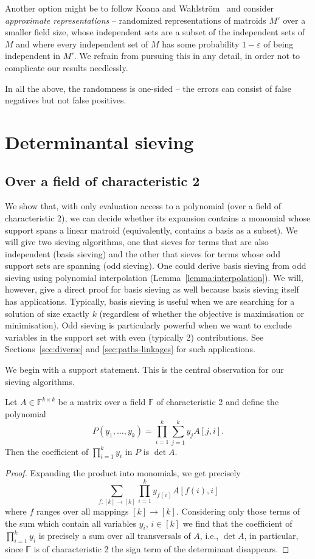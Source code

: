 \documentclass{theoretics}
\newcommand{\F}{\ensuremath{\mathbb F}\xspace}
\begin{document}
Another option might be to follow Koana and Wahlström~\cite{KoanaW25stacs}
and consider \emph{approximate representations} -- randomized
representations of matroids $M'$ over a smaller field size, whose
independent sets are a subset of the independent sets of $M$
and where every independent set of $M$ has some probability $1-\varepsilon$
of being independent in $M'$. We refrain from pursuing this in any detail,
in order not to complicate our results needlessly.

In all the above, the randomness is one-sided -- the errors can
consist of false negatives but not false positives. 


\section{Determinantal sieving}
\label{sec:sieving} 

\subsection{Over a field of characteristic 2}

We show that, with only evaluation access to a polynomial (over a
field of characteristic 2), we  can decide whether its expansion contains a monomial whose support spans a linear matroid
(equivalently, contains a basis as a subset).
We will give two sieving algorithms, one that sieves for terms that are also independent (basis sieving) and the other that sieves for terms whose odd support sets are spanning (odd sieving).
One could derive basis sieving from odd sieving using polynomial interpolation (Lemma~\ref{lemma:interpolation}).
We will, however, give a direct proof for basis sieving as well because basis sieving itself has applications.
Typically, basis sieving is useful when we are searching for a solution of size exactly $k$ (regardless of whether the objective is maximisation or minimisation).
Odd sieving is particularly powerful when we want to exclude variables in the support set with even (typically 2) contributions.
See Sections~\ref{sec:diverse} and \ref{sec:paths-linkages} for such applications.

We begin with a support statement. This is the central observation
for our sieving algorithms.

\begin{lemma} \label{lemma:sieve-determinant}
  Let $A \in \F^{k \times k}$ be a matrix over a field $\F$ of
  characteristic 2 and define the polynomial
  \[
    P(y_1,\ldots,y_k) = \prod_{i=1}^k \sum_{j=1}^k y_j A[j,i].
  \]
  Then the coefficient of $\prod_{i=1}^k y_i$ in $P$
  is $\det A$. 
\end{lemma}
\begin{proof}
  Expanding the product into monomials, we get precisely
  \[
    \sum_{f \colon [k] \to [k]} \prod_{i=1}^k y_{f(i)} A[f(i),i]
  \]
  where $f$ ranges over all mappings $[k] \to [k]$.
  Considering only those terms of the sum which contain
  all variables $y_i$, $i \in [k]$ we find that the coefficient of
  $\prod_{i=1}^k y_i$ is precisely a sum over all transversals of $A$,
  i.e., $\det A$, in particular, since $\F$ is of characteristic 2
  the sign term of the determinant disappears. 
\end{proof}
\end{document}
